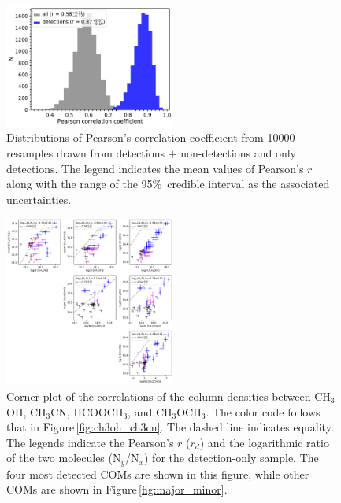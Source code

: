 \documentclass[twocolumn]{aastex62}
\newcommand{\methylformate}{\mbox{HCOOCH$_{3}$}}
\newcommand{\methanol}{\mbox{CH$_{3}$OH}}
\newcommand{\dimethylether}{\mbox{CH$_{3}$OCH$_{3}$}}
\newcommand{\methylcyanide}{\mbox{CH$_{3}$CN}}
\begin{document}
\begin{figure}[htbp!]
  \centering
  \includegraphics[width=0.5\textwidth]{pearson_r_ch3oh_ch3cn.pdf}
  \caption{Distributions of Pearson's correlation coefficient from 10000 resamples drawn from detections $+$ non-detections and only detections.  The legend indicates the mean values of Pearson's $r$ along with the range of the 95\%\ credible interval as the associated uncertainties.}
  \label{fig:pearson_distribution}
\end{figure}

\begin{figure}[htbp!]
  \centering
  \includegraphics[width=0.5\textwidth]{corner_Ncol_correlations.pdf}
  \caption{Corner plot of the correlations of the column densities between \methanol, \methylcyanide, \methylformate, and \dimethylether.  The color code follows that in Figure\,\ref{fig:ch3oh_ch3cn}.  The dashed line indicates equality.  The legends indicate the Pearson's $r$ ($r_{d}$) and the logarithmic ratio of the two molecules (N$_{y}$/N$_{x}$) for the detection-only sample.  The four most detected COMs are shown in this figure, while other COMs are shown in Figure\,\ref{fig:major_minor}.}
  \label{fig:corner}
\end{figure}
\end{document}

